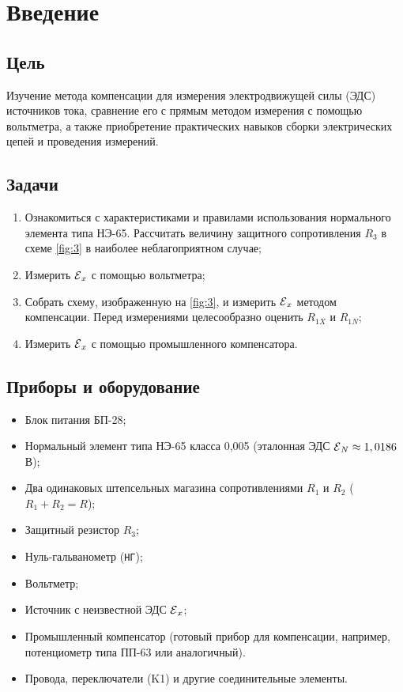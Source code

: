 \section{Введение}
\subsection*{Цель} 
Изучение метода компенсации для измерения электродвижущей силы (ЭДС) источников тока, сравнение его с прямым методом измерения с помощью вольтметра, а также приобретение практических навыков сборки электрических цепей и проведения измерений.

\subsection*{Задачи} 
\begin{enumerate}
	\item Ознакомиться с характеристиками и правилами использования нормального элемента типа НЭ-65. Рассчитать величину защитного сопротивления $R_3$ в схеме \cref{fig:3} в наиболее неблагоприятном случае;
	\item Измерить $\operatorname{\mathcal{E}}_x$ с помощью вольтметра;
	\item Собрать схему, изображенную на \cref{fig:3}, и измерить $\operatorname{\mathcal{E}}_x$ методом компенсации. Перед измерениями целесообразно оценить $R_{1X}$ и $R_{1N}$;
	\item Измерить $\operatorname{\mathcal{E}}_x$ с помощью промышленного компенсатора.
\end{enumerate}

\subsection*{Приборы и оборудование} 
\begin{itemize}
	\item Блок питания БП-28;
	\item Нормальный элемент типа НЭ-65 класса 0,005 (эталонная ЭДС $\operatorname{\mathcal{E}}_N \approx 1,0186$ В);
	\item Два одинаковых штепсельных магазина сопротивлениями $R_1$ и $R_2$ ($R_1 + R_2 = R$);
	\item Защитный резистор $R_3$;
	\item Нуль-гальванометр (\verb|НГ|);
	\item Вольтметр;
	\item Источник с неизвестной ЭДС $\operatorname{\mathcal{E}}_x$;
	\item Промышленный компенсатор (готовый прибор для компенсации, например, потенциометр типа ПП-63 или аналогичный).
	\item Провода, переключатели (K1) и другие соединительные элементы.
\end{itemize}